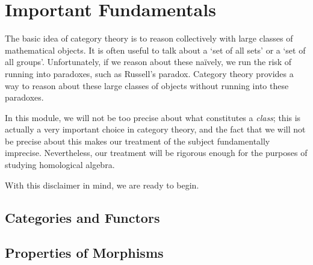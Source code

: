 \section{Important Fundamentals}

The basic idea of category theory is to reason collectively with large classes of mathematical objects. It is often useful to talk about a `set of all sets' or a `set of all groups'. Unfortunately, if we reason about these naïvely, we run the risk of running into paradoxes, such as Russell's paradox. Category theory provides a way to reason about these large classes of objects without running into these paradoxes.

In this module, we will not be too precise about what constitutes a \textit{class}; this is actually a very important choice in category theory, and the fact that we will not be precise about this makes our treatment of the subject fundamentally imprecise. Nevertheless, our treatment will be rigorous enough for the purposes of studying homological algebra.

With this disclaimer in mind, we are ready to begin.

\subsection{Categories and Functors}



\subsection{Properties of Morphisms}